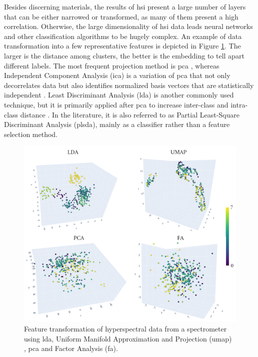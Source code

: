 Besides discerning materials, the results of \acrshort{hsi} present a large number of layers that can be either narrowed or transformed, as many of them present a high correlation. Otherwise, the large dimensionality of \acrshort{hsi} data leads neural networks and other classification algorithms to be hugely complex. An example of data transformation into a few representative features is depicted in Figure \ref{fig:feature_reduction_spectrometer}. The larger is the distance among clusters, the better is the embedding to tell apart different labels. The most frequent projection method is \acrshort{pca} \cite{jiang_rapid_2022, shenming_new_2022, lu_hyperspectral_2022}, whereas Independent Component Analysis (\acrshort{ica}) is a variation of \acrshort{pca} that not only decorrelates data but also identifies normalized basis vectors that are statistically independent \cite{pu_hyperspectral_2017}. Least Discriminant Analysis (\acrshort{lda}) is another commonly used technique, but it is primarily applied after \acrshort{pca} to increase inter-class and intra-class distance \cite{shenming_new_2022}. In the literature, it is also referred to as Partial Least-Square Discriminant Analysis (\acrshort{plsda}), mainly as a classifier rather than a feature selection method.

\begin{figure}[ht]
    \centering
    \includegraphics[width=\linewidth]{figs/vineyard_classification/feature_reduction.png}
	\caption{Feature transformation of hyperspectral data from a spectrometer using \acrshort{lda}, Uniform Manifold Approximation and Projection (\acrshort{umap}) \cite{mcinnes_umap_2020}, \acrshort{pca} and Factor Analysis (\acrshort{fa}).  }
	\label{fig:feature_reduction_spectrometer}
\end{figure}

